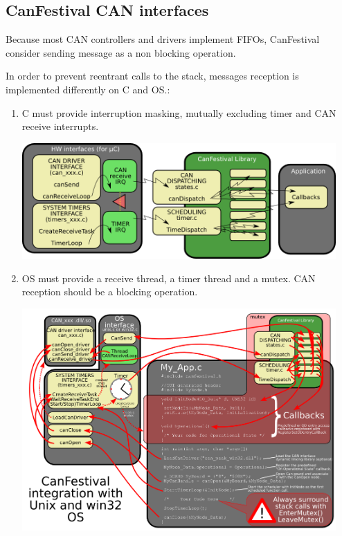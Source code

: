 \documentclass[12pt,english,a4paper]{book}
\begin{document}
\bigskip{}



\subsection{CanFestival CAN interfaces}

Because most CAN controllers and drivers implement FIFOs, CanFestival
consider sending message as a non blocking operation.

In order to prevent reentrant calls to the stack, messages reception
is implemented differently on {\textmu}C and OS.:

\begin{enumerate}
\item {\textmu}C must provide interruption masking, mutually excluding timer and CAN receive interrupts.\\



\begin{center}
\includegraphics[width=12cm]{Pictures/10000201000003CA0000016604E6A5EF} 
\par\end{center}

\item OS must provide a receive thread, a timer thread and a mutex. CAN
reception should be a blocking operation.\\



\begin{center}
\includegraphics[width=12cm]{Pictures/10000201000003F9000002CF8B0CDAEA} 
\par\end{center}

\end{enumerate}
\end{document}

